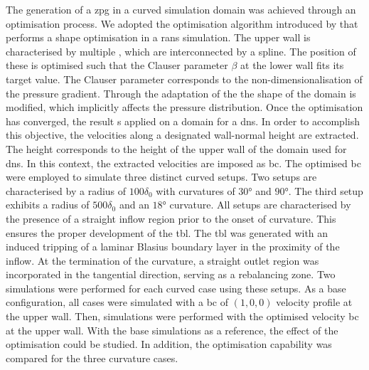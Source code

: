 The generation of a \acrshort{zpg} in a curved simulation domain was achieved through an optimisation process.
We adopted the optimisation algorithm introduced by \citet{morita_applying_2022} that performs a shape optimisation in a \acrshort{rans} simulation.
The upper wall is characterised by multiple  , which are interconnected by a spline.
The position of these  is optimised such that the Clauser parameter $\beta$ at the lower wall fits its target value.
The Clauser parameter corresponds to the non-dimensionalisation of the pressure gradient.
Through the adaptation of the  the shape of the domain is modified, which implicitly affects the pressure distribution.
Once the optimisation has converged, the result s applied on a domain for a \acrshort{dns}.
In order to accomplish this objective, the velocities along a designated wall-normal height are extracted.
The height corresponds to the height of the upper wall of the domain used for \acrshort{dns}.
In this context, the extracted velocities are imposed as   \acrlong{bc}.
%
The optimised \acrlong{bc} were employed to simulate three distinct  curved setups.
Two setups are characterised by a radius of $100\delta_0$ with curvatures of $30$° and $90$°.
The third setup exhibits a radius of $500 \delta_0$ and an $18$° curvature.
All setups are characterised by the presence of a straight inflow region prior to the onset of curvature. This ensures the proper development of the \acrshort{tbl}.
The \acrshort{tbl} was generated with an induced tripping of a laminar Blasius boundary layer in the proximity of the inflow.
At the termination of the curvature, a straight outlet region was  incorporated in the tangential direction, serving as a rebalancing zone.
 Two simulations were performed for each curved case using these setups. 
 As a base configuration, all cases were  simulated with a  \acrlong{bc} of $(1,0,0)$ velocity profile at the upper wall.
Then,  simulations were performed with the optimised velocity \acrlong{bc} at the upper wall.
With the base simulations as a reference, the effect of the optimisation could be studied.
In addition, the optimisation capability was compared for the three curvature cases.

